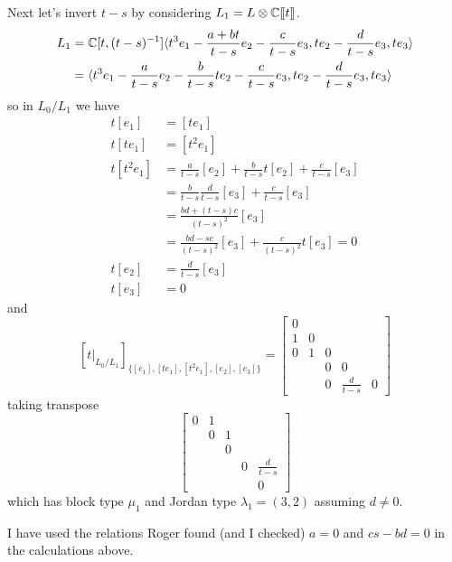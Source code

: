 \documentclass{article}
\begin{document}
\begin{example}
    Next let's invert $t-s$ by considering $L_1 = L\otimes\mathbb C[\hspace{-.12em}[ {t} ]\hspace{-.12em}]$. 
    \[
    \begin{aligned}
        L_1 &= \mathbb C[t,(t-s)^{-1}]\langle
        t^3 e_1 - \frac{a+bt}{t-s}e_2 - \frac c {t-s} e_3, te_2 - \frac d {t-s} e_3 , te_3 
        \rangle \\
        &= \langle
        t^3 e_1 - \frac{a}{t-s}e_2 - \frac b{t-s} te_2 - \frac c {t-s} e_3, te_2 - \frac d {t-s} e_3 , te_3 
        \rangle
    \end{aligned}
    \]
    so in $L_0/L_1$ we have 
    \begin{align*}
        t[e_1] &= [te_1] \\
        t[te_1] &= [t^2 e_1] \\ 
        t[t^2e_1] &= \frac{a}{t-s}[e_2] + \frac{b}{t-s} t[e_2] + \frac c {t-s} [e_3] \\
                  &= \frac b{t-s} \frac d{t-s} [e_3] + \frac c {t-s} [e_3] \\ 
                  &= \frac {bd + (t-s) c} {(t-s)^2} [e_3] \\
                  &= \frac{bd - sc}{(t-s)^2}[e_3] + \frac c {(t-s)^2} t[e_3] = 0 \\ 
        t[e_2] &= \frac d {t-s} [e_3] \\ 
        t[e_3] &= 0 
    \end{align*}
    and 
    \[
    \left[t\big|_{L_0/L_1}\right]_{\{[e_1],[te_1],[t^2e_1],[e_2],[e_3]\}} = \begin{bmatrix}
        0 \\
        1 & 0 \\
        0 & 1 & 0 \\
          & & 0 & 0 \\
          & & 0 & \frac d {t-s} & 0  
    \end{bmatrix}
    \]
    taking transpose 
    \[
        \begin{bmatrix}
            0 & 1\\
              & 0 & 1\\
              &   & 0 &  &  \\
              & & & 0 & \frac d {t-s} \\
              & & & & 0  
        \end{bmatrix}
    \]
    which has block type $\mu_1$ and Jordan type $\lambda_1 = (3,2)$ assuming $d\ne 0$.

    I have used the relations Roger found (and I checked) $a = 0$ and $cs - bd = 0$ in the calculations above. 
    

\end{example}
\end{document}
